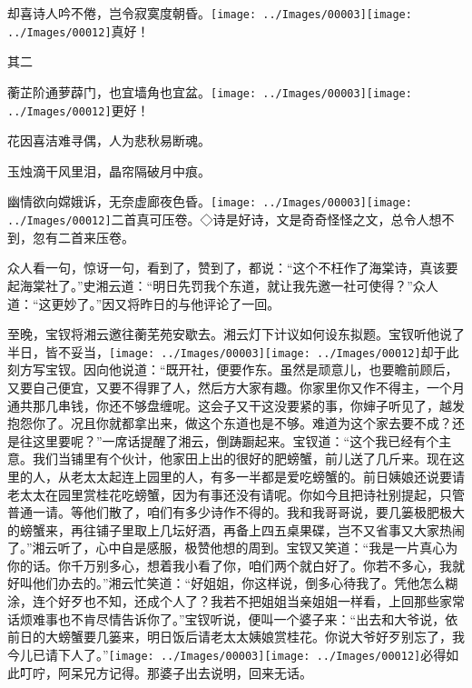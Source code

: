 却喜诗人吟不倦，岂令寂寞度朝昏。{\texttt{[image: ../Images/00003]}\texttt{[image: ../Images/00012]}\footnotesize \kaishu 真好！}

其二

蘅芷阶通萝薜门，也宜墙角也宜盆。{\texttt{[image: ../Images/00003]}\texttt{[image: ../Images/00012]}\footnotesize \kaishu 更好！}

花因喜洁难寻偶，人为悲秋易断魂。

玉烛滴干风里泪，晶帘隔破月中痕。

幽情欲向嫦娥诉，无奈虚廊夜色昏。{\texttt{[image: ../Images/00003]}\texttt{[image: ../Images/00012]}\footnotesize \kaishu 二首真可压卷。◇诗是好诗，文是奇奇怪怪之文，总令人想不到，忽有二首来压卷。}

众人看一句，惊讶一句，看到了，赞到了，都说：``这个不枉作了海棠诗，真该要起海棠社了。''史湘云道：``明日先罚我个东道，就让我先邀一社可使得？''众人道：``这更妙了。''因又将昨日的与他评论了一回。

至晚，宝钗将湘云邀往蘅芜苑安歇去。湘云灯下计议如何设东拟题。宝钗听他说了半日，皆不妥当，{\texttt{[image: ../Images/00003]}\texttt{[image: ../Images/00012]}\footnotesize \kaishu 却于此刻方写宝钗。}因向他说道：``既开社，便要作东。虽然是顽意儿，也要瞻前顾后，又要自己便宜，又要不得罪了人，然后方大家有趣。你家里你又作不得主，一个月通共那几串钱，你还不够盘缠呢。这会子又干这没要紧的事，你婶子听见了，越发抱怨你了。况且你就都拿出来，做这个东道也是不够。难道为这个家去要不成？还是往这里要呢？''一席话提醒了湘云，倒踌蹰起来。宝钗道：``这个我已经有个主意。我们当铺里有个伙计，他家田上出的很好的肥螃蟹，前儿送了几斤来。现在这里的人，从老太太起连上园里的人，有多一半都是爱吃螃蟹的。前日姨娘还说要请老太太在园里赏桂花吃螃蟹，因为有事还没有请呢。你如今且把诗社别提起，只管普通一请。等他们散了，咱们有多少诗作不得的。我和我哥哥说，要几篓极肥极大的螃蟹来，再往铺子里取上几坛好酒，再备上四五桌果碟，岂不又省事又大家热闹了。''湘云听了，心中自是感服，极赞他想的周到。宝钗又笑道：``我是一片真心为你的话。你千万别多心，想着我小看了你，咱们两个就白好了。你若不多心，我就好叫他们办去的。''湘云忙笑道：``好姐姐，你这样说，倒多心待我了。凭他怎么糊涂，连个好歹也不知，还成个人了？我若不把姐姐当亲姐姐一样看，上回那些家常话烦难事也不肯尽情告诉你了。''宝钗听说，便叫一个婆子来：``出去和大爷说，依前日的大螃蟹要几篓来，明日饭后请老太太姨娘赏桂花。你说大爷好歹别忘了，我今儿已请下人了。''{\texttt{[image: ../Images/00003]}\texttt{[image: ../Images/00012]}\footnotesize \kaishu 必得如此叮咛，阿呆兄方记得。}那婆子出去说明，回来无话。


